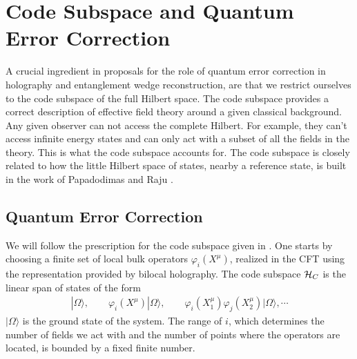 \documentclass[a4paper,12pt]{article}
\def\bea{\begin{eqnarray}}
\def\eea{\end{eqnarray}}
\begin{document}
\section{Code Subspace and Quantum Error Correction}\label{qecsec}

A crucial ingredient in proposals for the role of quantum error correction in holography and entanglement wedge 
reconstruction, are that we restrict ourselves to the code subspace of the full Hilbert space.
The code subspace provides a correct description of effective field theory around a given classical background. 
Any given observer can not access the complete Hilbert.
For example, they can't access infinite energy states and can only act with a subset of all the fields in the theory.
This is what the code subspace accounts for.
The code subspace is closely related to how the little Hilbert space of states, nearby a reference state, is built in the 
work of Papadodimas and Raju \cite{Papadodimas:2012aq,Papadodimas:2013jku}.

\subsection{Quantum Error Correction}

We will follow the prescription for the code subspace given in \cite{Almheiri:2014lwa}.
One starts by choosing a finite set of local bulk operators $\varphi_i(X^\mu)$, realized in the CFT using the 
representation provided by bilocal holography. 
The code subspace ${\cal H}_C$ is the linear span of states of the form
%
\bea
|\Omega\rangle,\qquad \varphi_i(X^\mu)|\Omega\rangle,\qquad 
\varphi_i(X^\mu_1)\varphi_j (X^\mu_2)|\Omega\rangle,\cdots
\eea
%
$|\Omega\rangle$ is the ground state of the system.
The range of $i$, which determines the number of fields we act with and the number of points where the operators are 
located, is bounded by a fixed finite number.
\end{document}
